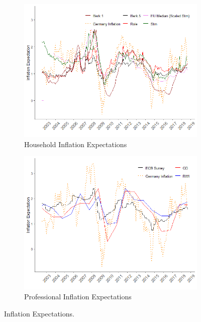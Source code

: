 \documentclass[review]{elsarticle}
\begin{document}
   \begin{figure}[!ht]
    \centering
\begin{subfigure}{6cm}
    \includegraphics{Household_Inf_Exp.png}
    \caption{Household Inflation Expectations}
    \label{Inflation_Count}
\end{subfigure}
\hfil
\begin{subfigure}{6cm}
    \includegraphics{Prof_Inf_Exp.png}
    \caption{Professional Inflation Expectations}
    \label{Inflation_Sentiment_Direction}
\end{subfigure}
\caption{Inflation Expectations.}
\label{fig:News Index}
    \end{figure}
\end{document}
